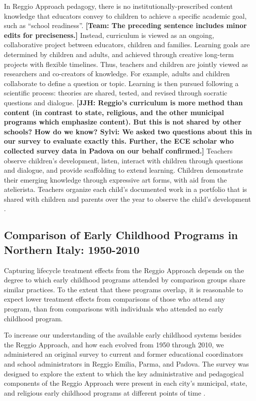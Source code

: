 In Reggio Approach pedagogy, there is no institutionally-prescribed content knowledge that educators convey to children to achieve a specific academic goal, such as ``school readiness''. \textbf{[Team: The preceding sentence includes minor edits for preciseness.]} Instead, curriculum is viewed as an ongoing, collaborative project between educators, children and families. Learning goals are determined by children and adults, and achieved through creative long-term projects with flexible timelines. Thus, teachers and children are jointly viewed as researchers and co-creators of knowledge. For example, adults and children collaborate to define a question or topic. Learning is then pursued following a scientific process: theories are shared, tested, and revised through socratic questions and dialogue. \textbf{[JJH: Reggio's curriculum is more method than content (in contrast to state, religious, and the other municipal programs which emphasize content). But this is not shared by other schools? How do we know? Sylvi: We asked two questions about this in our survey to evaluate exactly this. Further, the ECE scholar who collected survey data in Padova on our behalf confirmed.]} Teachers observe children's development, listen, interact with children through questions and dialogue, and provide scaffolding to extend learning. Children demonstrate their emerging knowledge through expressive art forms, with aid from the atelierista. Teachers organize each child's documented work in a portfolio that is shared with children and parents over the year to observe the child's development \citep{Rinaldi_2006_ReggioEmilia_BOOK,Giudici-Nicolosi_2014_Reggio-Approach}.

\subsection{Comparison of Early Childhood Programs in Northern Italy: 1950-2010}

Capturing lifecycle treatment effects from the Reggio Approach depends on the degree to which early childhood programs attended by comparison groups share similar practices. To the extent that these programs overlap, it is reasonable to expect lower treatment effects from comparisons of those who attend any program, than from comparisons with individuals who attended no early childhood program. 

To increase our understanding of the available early childhood systems besides the Reggio Approach, and how each evolved from 1950 through 2010, we administered an original survey to current and former educational coordinators and school administrators in Reggio Emilia, Parma, and Padova. The survey was designed to explore the extent to which the key administrative and pedagogical components of the Reggio Approach were present in each city's municipal, state, and religious early childhood programs at different points of time \citep{CEHD_2016_Historical-Analysis}. 

